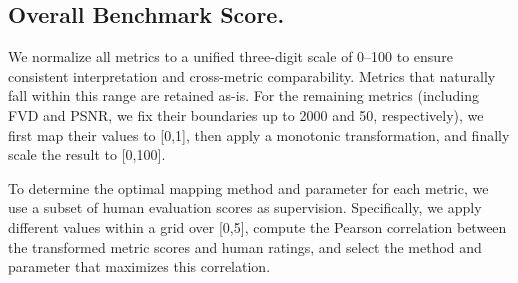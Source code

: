 






\subsection{Overall Benchmark Score.}
We normalize all metrics to a unified three-digit scale of 0–100 to ensure consistent interpretation and cross-metric comparability. Metrics that naturally fall within this range are retained as-is. For the remaining metrics (including FVD and PSNR, we fix their boundaries up to 2000 and 50, respectively), we first map their values to [0,1], then apply a monotonic transformation, and finally scale the result to [0,100].

To determine the optimal mapping method and parameter for each metric, we use a subset of human evaluation scores as supervision. Specifically, we apply different values within a grid over [0,5], compute the Pearson correlation between the transformed metric scores and human ratings, and select the method and parameter that maximizes this correlation. 

